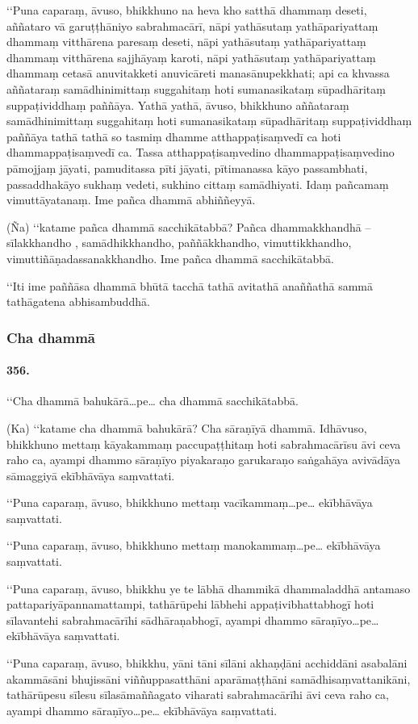 ‘‘Puna caparaṃ, āvuso, bhikkhuno na heva kho satthā dhammaṃ deseti, aññataro vā garuṭṭhāniyo sabrahmacārī, nāpi yathāsutaṃ yathāpariyattaṃ dhammaṃ vitthārena paresaṃ deseti, nāpi yathāsutaṃ yathāpariyattaṃ dhammaṃ vitthārena sajjhāyaṃ karoti, nāpi yathāsutaṃ yathāpariyattaṃ dhammaṃ cetasā anuvitakketi anuvicāreti manasānupekkhati; api ca khvassa aññataraṃ samādhinimittaṃ suggahitaṃ hoti sumanasikataṃ sūpadhāritaṃ suppaṭividdhaṃ paññāya. Yathā yathā, āvuso, bhikkhuno aññataraṃ samādhinimittaṃ suggahitaṃ hoti sumanasikataṃ sūpadhāritaṃ suppaṭividdhaṃ paññāya tathā tathā so tasmiṃ dhamme atthappaṭisaṃvedī ca hoti dhammappaṭisaṃvedī ca. Tassa atthappaṭisaṃvedino dhammappaṭisaṃvedino pāmojjaṃ jāyati, pamuditassa pīti jāyati, pītimanassa kāyo passambhati, passaddhakāyo sukhaṃ vedeti, sukhino cittaṃ samādhiyati. Idaṃ pañcamaṃ vimuttāyatanaṃ. Ime pañca dhammā abhiññeyyā.

(Ña) ‘‘katame pañca dhammā sacchikātabbā? Pañca dhammakkhandhā – sīlakkhandho , samādhikkhandho, paññākkhandho, vimuttikkhandho, vimuttiñāṇadassanakkhandho. Ime pañca dhammā sacchikātabbā.

‘‘Iti ime paññāsa dhammā bhūtā tacchā tathā avitathā anaññathā sammā tathāgatena abhisambuddhā.

\subsubsection{Cha dhammā}

\paragraph{356.} ‘‘Cha dhammā bahukārā…pe… cha dhammā sacchikātabbā.

(Ka) ‘‘katame cha dhammā bahukārā? Cha sāraṇīyā dhammā. Idhāvuso, bhikkhuno mettaṃ kāyakammaṃ paccupaṭṭhitaṃ hoti sabrahmacārīsu āvi ceva raho ca, ayampi dhammo sāraṇīyo piyakaraṇo garukaraṇo saṅgahāya avivādāya sāmaggiyā ekībhāvāya saṃvattati.

‘‘Puna caparaṃ, āvuso, bhikkhuno mettaṃ vacīkammaṃ…pe… ekībhāvāya saṃvattati.

‘‘Puna caparaṃ, āvuso, bhikkhuno mettaṃ manokammaṃ…pe… ekībhāvāya saṃvattati.

‘‘Puna caparaṃ, āvuso, bhikkhu ye te lābhā dhammikā dhammaladdhā antamaso pattapariyāpannamattampi, tathārūpehi lābhehi appaṭivibhattabhogī hoti sīlavantehi sabrahmacārīhi sādhāraṇabhogī, ayampi dhammo sāraṇīyo…pe… ekībhāvāya saṃvattati.

‘‘Puna caparaṃ, āvuso, bhikkhu, yāni tāni sīlāni akhaṇḍāni acchiddāni asabalāni akammāsāni bhujissāni viññuppasatthāni aparāmaṭṭhāni samādhisaṃvattanikāni, tathārūpesu sīlesu sīlasāmaññagato viharati sabrahmacārīhi āvi ceva raho ca, ayampi dhammo sāraṇīyo…pe… ekībhāvāya saṃvattati.

